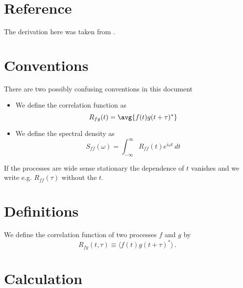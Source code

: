 \section{Reference}

The derivation here was taken from \cite{MattL:modulated_noise:2015}.

\section{Conventions}

There are two possibly confusing conventions in this document
\begin{itemize}
\item We define the correlation function as
\begin{equation}
R_{fg}(t) = \avg{f(t) g(t+\tau)^*}
\end{equation}
\item We define the spectral density as
\begin{equation}
S_{ff}(\omega) = \int_{-\infty}^\infty R_{ff}(t) e^{i \omega t}\,dt
\end{equation}
\end{itemize}

If the processes are wide sense stationary the dependence of $t$ vanishes and we write e.g. $R_{ff}(\tau)$ without the $t$.

\section{Definitions}

We define the correlation function of two processes $f$ and $g$ by
\begin{equation}
R_{fg}(t, \tau) \equiv  \langle f(t) g(t+\tau)^* \rangle \, .
\end{equation}

\section{Calculation}

